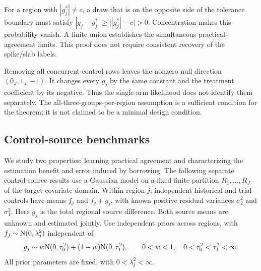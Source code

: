 For a region with $|g_j^*|\ne c$, a draw that is on the opposite side of the tolerance boundary must satisfy $|g_j-g_j^*|\geq\bigl||g_j^*|-c\bigr|>0$. Concentration makes this probability vanish. A finite union establishes the simultaneous practical-agreement limits. This proof does not require consistent recovery of the spike/slab labels.

Removing all concurrent-control rows leaves the nonzero null direction $(0_J,1_J,-1)$. It changes every $g_j$ by the same constant and the treatment coefficient by its negative. Thus the single-arm likelihood does not identify them separately. The all-three-groups-per-region assumption is a sufficient condition for the theorem; it is not claimed to be a minimal design condition.

\subsection{Control-source benchmarks}\label{sec:C.1}
We study two properties: learning practical agreement and characterizing the estimation benefit and error induced by borrowing. The following separate control-source results use a Gaussian model on a fixed finite partition $R_1,\ldots,R_J$ of the target covariate domain. Within region $j$, independent historical and trial controls have means $f_j$ and $f_j+g_j$, with known positive residual variances $\sigma_2^2$ and $\sigma_1^2$. Here $g_j$ is the total regional source difference. Both source means are unknown and estimated jointly. Use independent priors across regions, with $f_j\sim\mathrm{N}(0,\lambda_j^2)$ independent of
\[
g_j\sim w\mathrm{N}(0,\tau_0^2)+(1-w)\mathrm{N}(0,\tau_1^2),
\qquad 0<w<1,\quad 0<\tau_0^2<\tau_1^2<\infty.
\]
All prior parameters are fixed, with $0<\lambda_j^2<\infty$.


